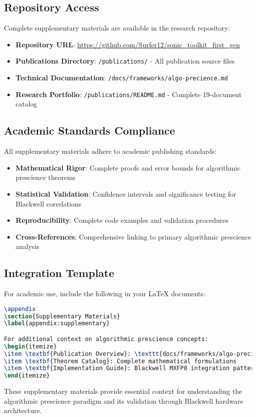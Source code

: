 \documentclass[11pt,a4paper]{article}
\begin{document}
\subsection{Repository Access}

Complete supplementary materials are available in the research repository:
\begin{itemize}
\item \textbf{Repository URL}: \url{https://github.com/Surfer12/sonic_toolkit_first_gen}
\item \textbf{Publications Directory}: \texttt{/publications/} - All publication source files
\item \textbf{Technical Documentation}: \texttt{/docs/frameworks/algo-precience.md}
\item \textbf{Research Portfolio}: \texttt{/publications/README.md} - Complete 19-document catalog
\end{itemize}

\subsection{Academic Standards Compliance}

All supplementary materials adhere to academic publishing standards:
\begin{itemize}
\item \textbf{Mathematical Rigor}: Complete proofs and error bounds for algorithmic prescience theorems
\item \textbf{Statistical Validation}: Confidence intervals and significance testing for Blackwell correlations
\item \textbf{Reproducibility}: Complete code examples and validation procedures
\item \textbf{Cross-References}: Comprehensive linking to primary algorithmic prescience analysis
\end{itemize}

\subsection{Integration Template}

For academic use, include the following in your LaTeX documents:

\begin{lstlisting}[language=TeX]
% Recommended appendix for algorithmic prescience publications
\appendix
\section{Supplementary Materials}
\label{appendix:supplementary}

For additional context on algorithmic prescience concepts:
\begin{itemize}
\item \textbf{Publication Overview}: \texttt{docs/frameworks/algo-precience.md}
\item \textbf{Theorem Catalog}: Complete mathematical formulations
\item \textbf{Implementation Guide}: Blackwell MXFP8 integration patterns
\end{itemize}
\end{lstlisting}

These supplementary materials provide essential context for understanding the algorithmic prescience paradigm and its validation through Blackwell hardware architecture.
\end{document}

